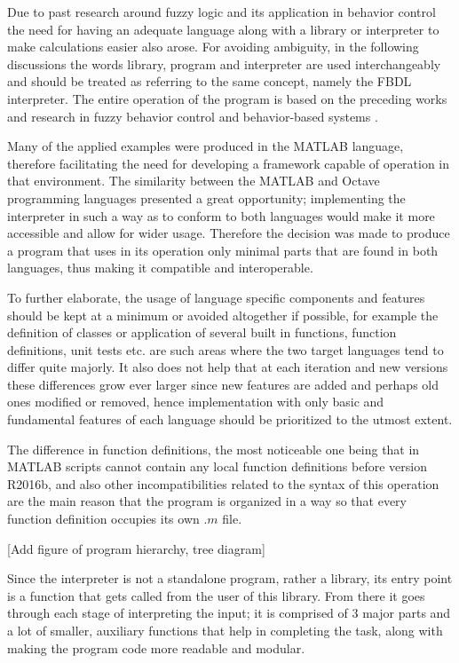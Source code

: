 
Due to past research around fuzzy logic and its application in behavior control the need for having an adequate language along with a library or interpreter to make calculations easier also arose. For avoiding ambiguity, in the following discussions the words library, program and interpreter are used interchangeably and should be treated as referring to the same concept, namely the FBDL interpreter. The entire operation of the program is based on the preceding works and research in fuzzy behavior control and behavior-based systems \cite{pillerkovacs2019}.

Many of the applied examples were produced in the MATLAB language, therefore facilitating the need for  developing a framework capable of operation in that environment. The similarity between the MATLAB and Octave programming languages presented a great opportunity; implementing the interpreter in such a way as to conform to both languages would make it more accessible and allow for wider usage. Therefore the decision was made to produce a program that uses in its operation only minimal parts that are found in both languages, thus making it compatible and interoperable.

To further elaborate, the usage of language specific components and features should be kept at a minimum or avoided altogether if possible, for example the definition of classes or application of several built in functions, function definitions, unit tests etc. are such areas where the two target languages tend to differ quite majorly. It also does not help that at each iteration and new versions these differences grow ever larger since new features are added and perhaps old ones modified or removed, hence implementation with only basic and fundamental features of each language should be prioritized to the utmost extent.


The difference in function definitions, the most noticeable one being that in MATLAB scripts cannot contain any local function definitions before version R2016b, and also other incompatibilities related to the syntax of this operation are the main reason that the program is organized in a way so that every function definition occupies its own $.m$ file. 

[Add figure of program hierarchy, tree diagram]

Since the interpreter is not a standalone program, rather a library, its entry point is a function that gets called from the user of this library. From there it goes through each stage of interpreting the input; it is comprised of 3 major parts and a lot of smaller, auxiliary functions that help in completing the task, along with making the program code more readable and modular.

